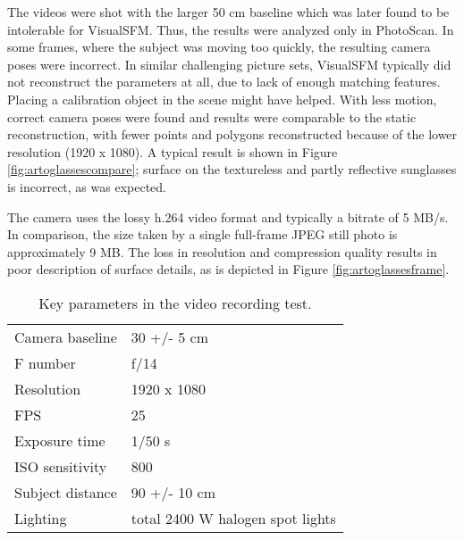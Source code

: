 The videos were shot with the larger 50 cm baseline which was later found to be intolerable for VisualSFM.
Thus, the results were analyzed only in PhotoScan.
In some frames, where the subject was moving too quickly, the resulting camera poses were incorrect.
In similar challenging picture sets, VisualSFM typically did not reconstruct the parameters at all, due to lack of enough matching features.
Placing a calibration object in the scene might have helped.
With less motion, correct camera poses were found and results were comparable to the static reconstruction, with fewer points and polygons reconstructed because of the lower resolution (1920 x 1080).
A typical result is shown in Figure \ref{fig:artoglassescompare}; surface on the textureless and partly reflective sunglasses is incorrect, as was expected.

The camera uses the lossy h.264 video format and typically a bitrate of 5 MB/s.
In comparison, the size taken by a single full-frame JPEG still photo is approximately 9 MB.
The loss in resolution and compression quality results in poor description of surface details, as is depicted in Figure \ref{fig:artoglassesframe}.

\begin{table}[t]
	\centering
	\begin{tabular}{l l}
		Camera baseline & 30 +/- 5 cm\\
		F number & f/14\\
		Resolution & 1920 x 1080\\
		FPS & 25\\
		Exposure time & 1/50 s\\
		ISO sensitivity & 800\\
		Subject distance & 90 +/- 10 cm\\
		Lighting & total 2400 W halogen spot lights\\
	\end{tabular}
	\caption{
		Key parameters in the video recording test.
	}
	\label{tab:samplevideoparams}
\end{table}




